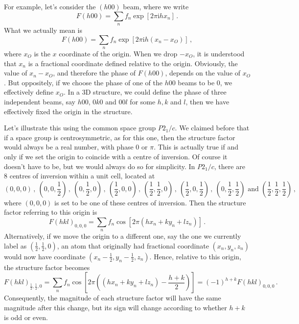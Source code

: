 \documentclass{article}
\theoremstyle{plain}\theoremheaderfont{\normalfont\itshape}\theorembodyfont{\rmfamily}\theoremseparator{.}\newtheorem*{rem}{Remark}\newtheorem*{ex}{Example}\newtheorem*{proof}{Proof}\newtheorem*{altp}{Alternative proof}
\theoremstyle{plain}\theoremheaderfont{\normalfont\bfseries}\theorembodyfont{\rmfamily}\theoremseparator{.}\newtheorem{thm}{Theorem}[section]\newtheorem{lem}[thm]{Lemma}\newtheorem{prop}[thm]{Proposition}\newtheorem*{cor}{Corollary}\newtheorem{defn}[thm]{Definition}\newtheorem{clm}[thm]{Claim}\newtheorem{clminproof}{Claim}\newtheorem*{law}{Law}\newtheorem{pos}[thm]{Postulate}
\theoremstyle{break}\theoremheaderfont{\normalfont\itshape}\theorembodyfont{\rmfamily}\theoremseparator{.\medskip}\newtheorem*{proofskip}{Proof}\newtheorem*{exs}{Examples}\newtheorem*{rems}{Remarks}
\theoremstyle{break}\theoremheaderfont{\normalfont\bfseries}\theorembodyfont{\rmfamily}\theoremseparator{.\medskip}\newtheorem{lemskip}[thm]{Lemma}\newtheorem{defnskip}[thm]{Definition}\newtheorem{propskip}[thm]{Proposition}\newtheorem{thmskip}[thm]{Theorem}
\numberwithin{equation}{section}
\newcommand{\ii}{\mathrm{i}}
\begin{document}
    For example, let's consider the \((h00)\) beam, where we write
    \begin{equation}
        F(h00)=\sum_n f_n\exp[2\pi \ii hx_n]\,.
    \end{equation}
    What we actually mean is
    \begin{equation}
        F(h00)=\sum_n f_n\exp[2\pi \ii h(x_n-x_{O})]\,,
    \end{equation}
    where \(x_{O}\) is the \(x\) coordinate of the origin. When we drop \(-x_O\), it is understood that \(x_n\) is a fractional coordinate defined relative to the origin. Obviously, the value of \(x_n-x_O\), and therefore the phase of \(F(h00)\), depends on the value of \(x_O\). But oppositely, if we choose the phase of one of the \(h00\) beams to be 0, we effectively define \(x_O\). In a 3D structure, we could define the phase of three independent beams, say \(h00\), \(0k0\) and \(00l\) for some \(h,k\) and \(l\), then we have effectively fixed the origin in the structure.

    Let's illustrate this using the common space group \(P2_1/c\). We claimed before that if a space group is centrosymmetric, as for this one, then the structure factor would always be a real number, with phase 0 or \(\pi\). This is actually true if and only if we set the origin to coincide with a centre of inversion. Of course it doesn't have to be, but we would always do so for simplicity. In \(P2_1/c\), there are 8 centres of inversion within a unit cell, located at
    \begin{equation}
        \textstyle (0,0,0)\,,\ (0,0,\frac{1}{2})\,,\ (0,\frac{1}{2},0)\,,\ (\frac{1}{2},0,0)\,,\ (\frac{1}{2},\frac{1}{2},0)\,,\ (\frac{1}{2},0,\frac{1}{2})\,,\ (0,\frac{1}{2},\frac{1}{2})\text{ and } (\frac{1}{2},\frac{1}{2},\frac{1}{2})\,,
    \end{equation}
    where \((0,0,0)\) is set to be one of these centres of inversion. Then the structure factor referring to this origin is
    \begin{equation}
        F(hkl)_{0,0,0}=\sum_n f_n\cos[2\pi(hx_n+ky_n+lz_n)]\,.
    \end{equation}
    Alternatively, if we move the origin to a different one, say the one we currently label as \((\frac{1}{2},\frac{1}{2},0)\), an atom that originally had fractional coordinate \((x_n,y_n,z_n)\) would now have coordinate \((x_n-\frac{1}{2},y_n-\frac{1}{2},z_n)\). Hence, relative to this origin, the structure factor becomes
    \begin{equation}
        F(hkl)_{\frac{1}{2},\frac{1}{2},0}=\sum_n f_n\cos\left[2\pi\left((hx_n+ky_n+lz_n)-\frac{h+k}{2}\right)\right]=(-1)^{h+k}F(hkl)_{0,0,0}\,.
    \end{equation}
    Consequently, the magnitude of each structure factor will have the same magnitude after this change, but its sign will change according to whether \(h+k\) is odd or even.
\end{document}
